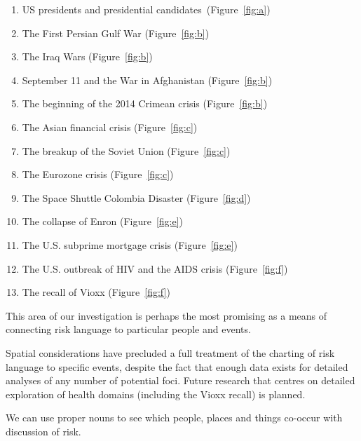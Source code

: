 \begin{enumerate} \setlength\itemsep{0em}
\item US presidents and presidential candidates~(Figure~\ref{fig:a})
\item The First Persian Gulf War (Figure~\ref{fig:b})                   
\item The Iraq Wars (Figure~\ref{fig:b})
\item September 11 and the War in Afghanistan (Figure~\ref{fig:b})   
\item The beginning of the 2014 Crimean crisis (Figure~\ref{fig:b})       
\item The Asian financial crisis (Figure~\ref{fig:c})
\item The breakup of the Soviet Union (Figure~\ref{fig:c})
\item The Eurozone crisis (Figure~\ref{fig:c})
\item The Space Shuttle Colombia Disaster (Figure~\ref{fig:d})
\item The collapse of Enron (Figure~\ref{fig:e})
\item The U.S. subprime mortgage crisis  (Figure~\ref{fig:e})
\item The U.S. outbreak of HIV and the AIDS crisis (Figure~\ref{fig:f})
\item The recall of Vioxx (Figure~\ref{fig:f})
\end{enumerate}
%
This area of our investigation is perhaps the most promising as a means of connecting risk language to particular people and events. 

Spatial considerations have precluded a full treatment of the charting of risk language to specific events, despite the fact that enough data exists for detailed analyses of any number of potential foci. Future research that centres on detailed exploration of health domains (including the Vioxx recall) is planned.

\vspace{5mm}\noindent\begin{tcolorbox}[colback=yellow!5,colframe=yellow!40!black,title=Summary: risk and proper nouns]
\parbox{1\textwidth}{%
We can use proper nouns to see which people, places and things co-occur with discussion of risk.}
\end{tcolorbox}
\vspace{5mm}

